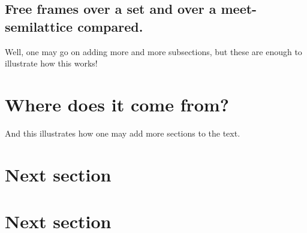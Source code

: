 \subsection{Free frames over a set and over a meet-semilattice compared.}
Well, one may go on adding more and more subsections, but these are enough to illustrate how this works!


\section{Where does it come from?}  %
\label{section1.3}

And this illustrates how one may add more sections to the text.


 \section{Next section}

 \section{Next section}


